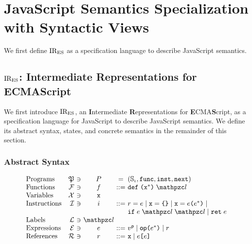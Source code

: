 \section{JavaScript Semantics Specialization with Syntactic Views}\label{sec:formal}

We first define $\text{IR}_\text{ES}$ as a specification language to describe JavaScript
semantics.

\subsection{$\text{IR}_\text{ES}$: Intermediate Representations for ECMAScript}

We first introduce $\text{IR}_\text{ES}$, an \textbf{I}ntermediate \textbf{R}epresentations
for \textbf{E}CMA\textbf{S}cript, as a specification language for JavaScript to
describe JavaScript semantics. We define its abstract syntax, states, and
concrete semantics in the remainder of this section.

\subsubsection{Abstract Syntax}

\[
  \begin{array}{lr@{~}c@{~}c@{~}c@{~}l}
    \text{Programs} & \progset &\ni& \prog &=& (\istset, \getfunc, \getinst,
    \getnext)\\

    \text{Functions} & \funcset &\ni& \func &::=&
    \kwdef \; \kwrl \varx^* \kwrr \; \lab\\

    \text{Variables} & \varset &\ni& \varx\\

    \text{Instructions} & \instset &\ni& \inst &::=&
    \refer = \expr \mid
    \varx = \kwcl \kwcr \mid
    \varx = \expr \kwrl \expr^* \kwrr \mid \\&&&&&
    \kwif \; \expr \; \lab \; \lab \mid
    \kwret \; \expr\\

    \text{Labels} & \labset &\ni& \lab\\

    \text{Expressions} & \exprset &\ni& \expr &::=&
    \pval \mid
    \op \kwrl \expr^* \kwrr \mid
    \refer\\

    \text{References} & \referset &\ni& \refer &::=&
    \varx \mid \expr \kwsl \expr \kwsr\\
  \end{array}
\]

